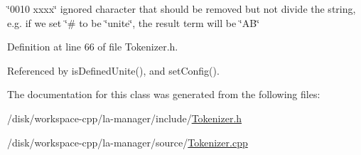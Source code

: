 \char`\"{}0010 xxxx\char`\"{} ignored character that should be removed but not divide the string, e.g. if we set \char`\"{}\# to be \char`\"{}unite\char`\"{}, the result term will be \char`\"{}AB\char`\"{} 



Definition at line 66 of file Tokenizer.h.

Referenced by isDefinedUnite(), and setConfig().

The documentation for this class was generated from the following files:\begin{CompactItemize}
\item 
/disk/workspace-cpp/la-manager/include/\hyperlink{Tokenizer_8h}{Tokenizer.h}\item 
/disk/workspace-cpp/la-manager/source/\hyperlink{Tokenizer_8cpp}{Tokenizer.cpp}\end{CompactItemize}
